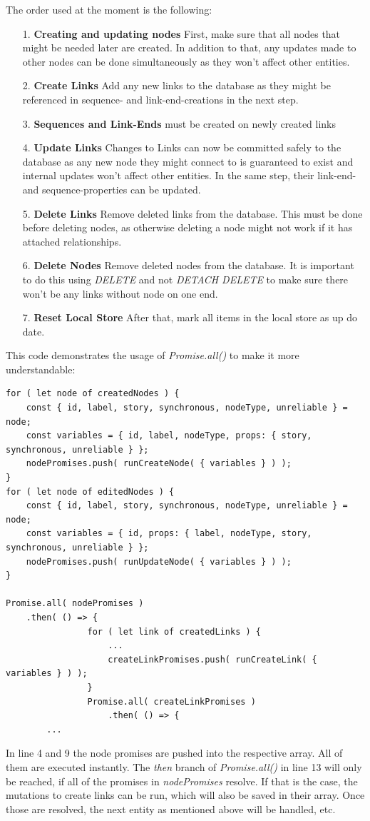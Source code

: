 The order used at the moment is the following:
\begin{itemize}
\item[1.] \textbf{Creating and updating nodes} First, make sure that all nodes that might be needed later are created. In addition to that, any updates made to other nodes can be done simultaneously as they won't affect other entities.
\item[2.] \textbf{Create Links} Add any new links to the database as they might be referenced in sequence- and link-end-creations in the next step.
\item[3.] \textbf{Sequences and Link-Ends} must be created on newly created links
\item[4.] \textbf{Update Links} Changes to Links can now be committed safely to the database as any new node they might connect to is guaranteed to exist and internal updates won't affect other entities. In the same step, their link-end- and sequence-properties can be updated.
\item[5.] \textbf{Delete Links} Remove deleted links from the database. This must be done before deleting nodes, as otherwise deleting a node might not work if it has attached relationships.
\item[6.] \textbf{Delete Nodes} Remove deleted nodes from the database. It is important to do this using \emph{DELETE} and not \emph{DETACH DELETE} to make sure there won't be any links without node on one end.
\item[7.] \textbf{Reset Local Store} After that, mark all items in the local store as up do date.
\end{itemize}

\newpage
This code demonstrates the usage of \emph{Promise.all()} to make it more understandable:
\begin{lstlisting}[caption={Usage of Promise.all()}]
for ( let node of createdNodes ) {
	const { id, label, story, synchronous, nodeType, unreliable } = node;
	const variables = { id, label, nodeType, props: { story, synchronous, unreliable } };
	nodePromises.push( runCreateNode( { variables } ) );
}
for ( let node of editedNodes ) {
	const { id, label, story, synchronous, nodeType, unreliable } = node;
	const variables = { id, props: { label, nodeType, story, synchronous, unreliable } };
	nodePromises.push( runUpdateNode( { variables } ) );
}

Promise.all( nodePromises ) 
	.then( () => {
				for ( let link of createdLinks ) {
					...
					createLinkPromises.push( runCreateLink( { variables } ) );				
				}
				Promise.all( createLinkPromises )
					.then( () => {	
		...
\end{lstlisting}
In line 4 and 9 the node promises are pushed into the respective array. All of them are executed instantly. The \emph{then} branch of \emph{Promise.all()} in line 13 will only be reached, if all of the promises in \emph{nodePromises} resolve. If that is the case, the mutations to create links can be run, which will also be saved in their array. Once those are resolved, the next entity as mentioned above will be handled, etc.

